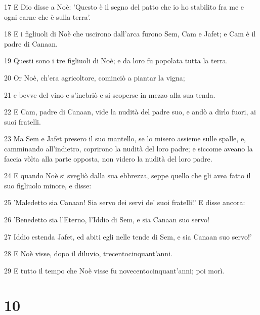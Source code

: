 \par 17 E Dio disse a Noè: 'Questo è il segno del patto che io ho stabilito fra me e ogni carne che è sulla terra'.
\par 18 E i figliuoli di Noè che uscirono dall'arca furono Sem, Cam e Jafet; e Cam è il padre di Canaan.
\par 19 Questi sono i tre figliuoli di Noè; e da loro fu popolata tutta la terra.
\par 20 Or Noè, ch'era agricoltore, cominciò a piantar la vigna;
\par 21 e bevve del vino e s'inebriò e si scoperse in mezzo alla sua tenda.
\par 22 E Cam, padre di Canaan, vide la nudità del padre suo, e andò a dirlo fuori, ai suoi fratelli.
\par 23 Ma Sem e Jafet presero il suo mantello, se lo misero assieme sulle spalle, e, camminando all'indietro, coprirono la nudità del loro padre; e siccome aveano la faccia vòlta alla parte opposta, non videro la nudità del loro padre.
\par 24 E quando Noè si svegliò dalla sua ebbrezza, seppe quello che gli avea fatto il suo figliuolo minore, e disse:
\par 25 'Maledetto sia Canaan! Sia servo dei servi de' suoi fratelli!' E disse ancora:
\par 26 'Benedetto sia l'Eterno, l'Iddio di Sem, e sia Canaan suo servo!
\par 27 Iddio estenda Jafet, ed abiti egli nelle tende di Sem, e sia Canaan suo servo!'
\par 28 E Noè visse, dopo il diluvio, trecentocinquant'anni.
\par 29 E tutto il tempo che Noè visse fu novecentocinquant'anni; poi morì.

\chapter{10}

